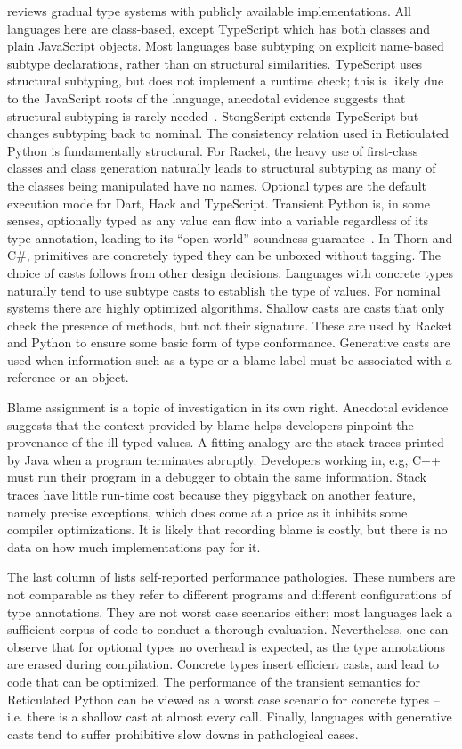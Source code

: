 \documentclass[acmlarge, anonymous, authordraft]{acmart}
\begin{document}
{} reviews gradual type systems with publicly available
implementations. All languages here are class-based, except TypeScript which
has both classes and plain JavaScript objects. Most languages base subtyping
on explicit name-based subtype declarations, rather than on structural
similarities.  TypeScript uses structural subtyping, but does not implement
a runtime check; this is likely due to the JavaScript roots of the language,
anecdotal evidence suggests that structural subtyping is rarely
needed~\cite{ecoop15}. StongScript extends TypeScript but changes subtyping
back to nominal.  The consistency relation used in Reticulated Python is
fundamentally structural.  For Racket, the heavy use of first-class classes
and class generation naturally leads to structural subtyping as many of the
classes being manipulated have no names.  Optional types are the default
execution mode for Dart, Hack and TypeScript.  Transient Python is, in some
senses, optionally typed as any value can flow into a variable regardless of
its type annotation, leading to its ``open world'' soundness
guarantee~\cite{siek14}.  In Thorn and C\#, primitives are concretely
typed they can be unboxed without tagging.  The choice of casts follows from
other design decisions. Languages with concrete types naturally tend to use
subtype casts to establish the type of values. For nominal systems there are
highly optimized algorithms. Shallow casts are casts that only check the
presence of methods, but not their signature. These are used by Racket and Python
to ensure some basic form of type conformance. Generative casts are used
when information such as a type or a blame label must be associated with a
reference or an object.

Blame assignment is a topic of investigation in its own right. Anecdotal
evidence suggests that the context provided by blame helps developers
pinpoint the provenance of the ill-typed values. A fitting analogy are the
stack traces printed by Java when a program terminates abruptly. Developers
working in, e.g, C++ must run their program in a debugger to obtain the same
information. Stack traces have little run-time cost because they piggyback
on another feature, namely precise exceptions, which does come at a price as
it inhibits some compiler optimizations. It is likely that recording blame
is costly, but there is no data on how much implementations pay for it.

The last column of  lists self-reported performance pathologies.
These numbers are not comparable as they refer to different programs and
different configurations of type annotations. They are not worst case scenarios
either; most languages lack a sufficient corpus of code to conduct a thorough
evaluation.  Nevertheless, one can observe that for optional types no overhead
is expected, as the type annotations are erased during compilation. Concrete
types insert efficient casts, and lead to code that can be optimized.  The
performance of the transient semantics for Reticulated Python can be viewed as a
worst case scenario for concrete types -- i.e. there is a shallow cast at almost
every call. Finally, languages with generative casts tend to suffer prohibitive
slow downs in pathological cases.
\end{document}
